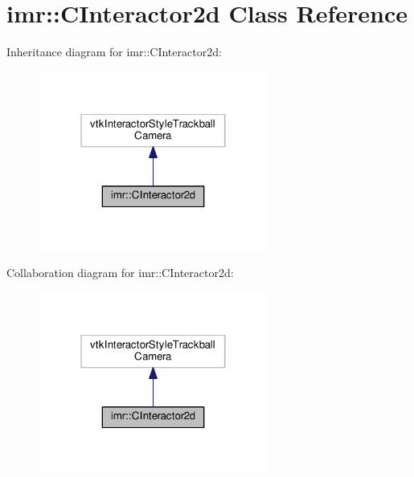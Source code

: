 \hypertarget{classimr_1_1CInteractor2d}{}\section{imr\+:\+:C\+Interactor2d Class Reference}
\label{classimr_1_1CInteractor2d}


Inheritance diagram for imr\+:\+:C\+Interactor2d\+:
\nopagebreak
\begin{figure}[H]
\begin{center}
\leavevmode
\includegraphics[width=214pt]{classimr_1_1CInteractor2d__inherit__graph}
\end{center}
\end{figure}


Collaboration diagram for imr\+:\+:C\+Interactor2d\+:
\nopagebreak
\begin{figure}[H]
\begin{center}
\leavevmode
\includegraphics[width=214pt]{classimr_1_1CInteractor2d__coll__graph}
\end{center}
\end{figure}
